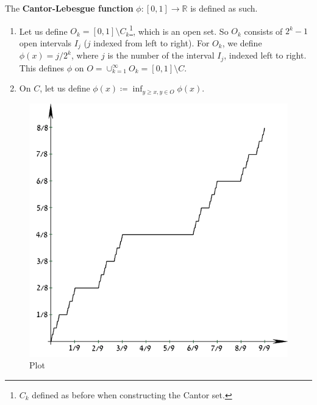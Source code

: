   \begin{definition}
    The \textbf{Cantor-Lebesgue function} $\phi: [0, 1] \to \mathbb{R}$ is defined as such. 
    \begin{enumerate}
      \item Let us define $O_k = [0, 1] \setminus C_k$\footnote{$C_k$ defined as before when constructing the Cantor set.}, which is an open set. So $O_k$ consists of $2^k - 1$ open intervals $I_j$ ($j$ indexed from left to right). For $O_k$, we define $\phi(x) = j / 2^k$, where $j$ is the number of the interval $I_j$, indexed left to right. This defines $\phi$ on $O = \cup_{k=1}^\infty O_k = [0, 1] \setminus C$. 
      \item On $C$, let us define $\phi(x) \coloneqq \inf_{y \geq x, y \in O} \phi (x)$. 
    \end{enumerate}

    \begin{figure}[H]
      \centering 
      \includegraphics[scale=0.3]{img/devils_staircase.png}
      \caption{Plot} 
      \label{fig:devils_staircase}
    \end{figure}
  \end{definition} 

